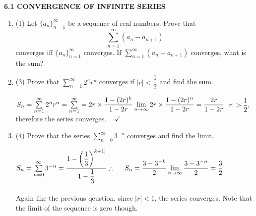 \documentclass[fleqn]{article}
\begin{document}
  \textbf{6.1 CONVERGENCE OF INFINITE SERIES}
  \begin{enumerate}
    \item (1) Let $\{ a_n \}_{n=1}^{\infty}$ be a sequence of real numbers. Prove that
    $$\sum\limits_{n=1}^{\infty} (a_n-a_{n+1})$$
    converges iff $\{ a_n \}_{n=1}^{\infty}$ converges. If $\sum\limits_{n=1}^{\infty} (a_n-a_{n+1})$ converges, 
    what is the sum?

          

    \item (3) Prove that $\sum\limits_{n=1}^{\infty} 2^n r^n$ converges if $|r| < \dfrac{1}{2}$ and find the sum. 

      \textcolor{hwColor}{
        $
          S_n=\sum\limits_{n=1}^{\infty} 2^n r^n
          =\sum\limits_{n=1}^{\infty}=2r \times \dfrac{1-(2r)^k}{1-2r}
          \\
          \\
          \\
          \lim\limits_{n \to \infty} 2r \times \dfrac{1-(2r)^n}{1-2r}=\dfrac{2r}{1-2r}
          \\
          \\
        $
        $|r|>\dfrac{1}{2}$, therefore the series converges. $~~~~ \checkmark$
        \\
      }

    \item (4) Prove that the series $\sum\limits_{n=0}^{\infty} 3^{-n}$ converges and find the limit. 

      \textcolor{hwColor}{
        $
          S_n=\sum\limits_{n=0}^{\infty} 3^{-n}=\dfrac{1-\left(\dfrac{1}{3}\right)^{k+1]}}{1-\dfrac{1}{3}}
          \\
          \\
          \\
          \therefore ~~~~ S_n=\dfrac{3-3^{-k}}{2}
          \\
          \\
          \\
          \lim\limits_{n \to \infty} \dfrac{3-3^{-n}}{2}=\dfrac{3}{2}
        $
        \\
        \\
        Again like the previous qeustion, since $|r|<1$, the series converges. Note that the limit of the sequence is zero though.
      }

 
          

  \end{enumerate}
\end{document}
